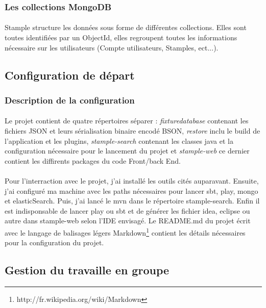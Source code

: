 \subsubsection{Les collections MongoDB}
\paragraph{}
Stample structure les données sous forme de différentes collections.
Elles sont toutes identifiées par un ObjectId, elles regroupent toutes les informations nécessaire sur les utilisateurs (Compte utilisateurs, Stamples, ect...).
\subsection{Configuration de départ}
\subsubsection{Description de la configuration}
\paragraph{}
Le projet contient de quatre répertoires séparer : \textit{fixturedatabase} contenant les fichiers JSON et leurs sérialisation binaire encodé BSON, \textit{restore} inclu le build de l'application et les plugins, \textit{stample-search} contenant les classes java et la configuration nécessaire pour le lancement du projet et \textit{stample-web} ce dernier contient les diffirents packages du code Front/back End.
\paragraph{}
Pour l'interraction avec le projet, j'ai installé les outils cités auparavant. Ensuite, j'ai configuré ma machine avec les paths nécessaires pour lancer sbt, play, mongo et elasticSearch. Puis, j'ai lancé le mvn dans le répertoire stample-search. Enfin il est indisponsable de lancer play ou sbt et de générer les fichier idea, eclipse ou autre dans stample-web selon l'IDE envisagé.    
Le README.md du projet écrit avec le langage de balisages légers Markdown\footnote{http://fr.wikipedia.org/wiki/Markdown} contient les détails nécessaires pour la configuration du projet.
\subsection{Gestion du travaille en groupe}

